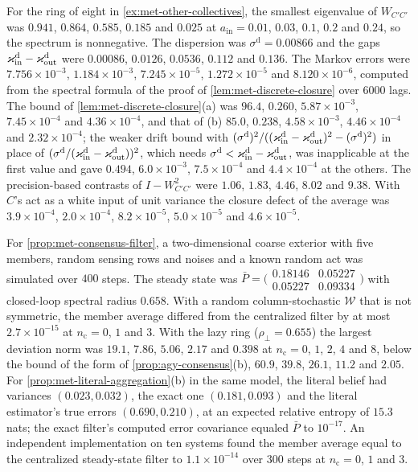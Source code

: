 \begin{numcheck}\label{chk:met-other-collectives}
For the ring of eight in \cref{ex:met-other-collectives}, the smallest eigenvalue of $W_{C'C'}$ was $0.941$, $0.864$, $0.585$, $0.185$ and $0.025$ at $a_{\mathrm{in}}=0.01$, $0.03$, $0.1$, $0.2$ and $0.24$, so the spectrum is nonnegative. The dispersion was $\sigma^{\mathrm d}=0.00866$ and the gaps $\varkappa_{\mathrm{in}}^{\mathrm d}-\varkappa_{\mathrm{out}}^{\mathrm d}$ were $0.00086$, $0.0126$, $0.0536$, $0.112$ and $0.136$. The Markov errors were $7.756\times10^{-3}$, $1.184\times10^{-3}$, $7.245\times10^{-5}$, $1.272\times10^{-5}$ and $8.120\times10^{-6}$, computed from the spectral formula of the proof of \cref{lem:met-discrete-closure} over $6000$ lags. The bound of \cref{lem:met-discrete-closure}(a) was $96.4$, $0.260$, $5.87\times10^{-3}$, $7.45\times10^{-4}$ and $4.36\times10^{-4}$, and that of (b) $85.0$, $0.238$, $4.58\times10^{-3}$, $4.46\times10^{-4}$ and $2.32\times10^{-4}$; the weaker drift bound with $(\sigma^{\mathrm d})^2/((\varkappa_{\mathrm{in}}^{\mathrm d}-\varkappa_{\mathrm{out}}^{\mathrm d})^2-(\sigma^{\mathrm d})^2)$ in place of $(\sigma^{\mathrm d}/(\varkappa_{\mathrm{in}}^{\mathrm d}-\varkappa_{\mathrm{out}}^{\mathrm d}))^2$, which needs $\sigma^{\mathrm d}<\varkappa_{\mathrm{in}}^{\mathrm d}-\varkappa_{\mathrm{out}}^{\mathrm d}$, was inapplicable at the first value and gave $0.494$, $6.0\times10^{-3}$, $7.5\times10^{-4}$ and $4.4\times10^{-4}$ at the others. The precision-based contrasts of $I-W_{C'C'}^2$ were $1.06$, $1.83$, $4.46$, $8.02$ and $9.38$. With $C$'s act as a white input of unit variance the closure defect of the average was $3.9\times10^{-4}$, $2.0\times10^{-4}$, $8.2\times10^{-5}$, $5.0\times10^{-5}$ and $4.6\times10^{-5}$.
\end{numcheck}

\begin{numcheck}\label{chk:met-inference}
For \cref{prop:met-consensus-filter}, a two-dimensional coarse exterior with five members, random sensing rows and noises and a known random act was simulated over $400$ steps. The steady state was $\bar P=\bigl(\begin{smallmatrix}0.18146&0.05227\\0.05227&0.09334\end{smallmatrix}\bigr)$ with closed-loop spectral radius $0.658$. With a random column-stochastic $\mathcal W$ that is not symmetric, the member average differed from the centralized filter by at most $2.7\times10^{-15}$ at $n_{\mathrm c}=0$, $1$ and $3$. With the lazy ring ($\rho_\perp=0.655$) the largest deviation norm was $19.1$, $7.86$, $5.06$, $2.17$ and $0.398$ at $n_{\mathrm c}=0$, $1$, $2$, $4$ and $8$, below the bound of the form of \cref{prop:agy-consensus}(b), $60.9$, $39.8$, $26.1$, $11.2$ and $2.05$. For \cref{prop:met-literal-aggregation}(b) in the same model, the literal belief had variances $(0.023,0.032)$, the exact one $(0.181,0.093)$ and the literal estimator's true errors $(0.690,0.210)$, at an expected relative entropy of $15.3$ nats; the exact filter's computed error covariance equaled $\bar P$ to $10^{-17}$. An independent implementation on ten systems found the member average equal to the centralized steady-state filter to $1.1\times10^{-14}$ over $300$ steps at $n_{\mathrm c}=0$, $1$ and $3$.
\end{numcheck}

